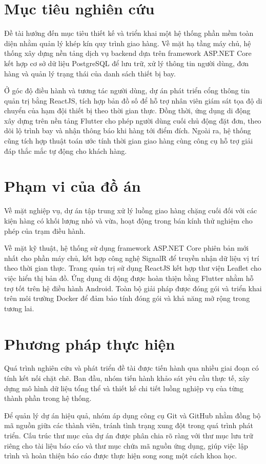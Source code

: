 \section{Mục tiêu nghiên cứu}
Đề tài hướng đến mục tiêu thiết kế và triển khai một hệ thống phần mềm toàn diện nhằm quản lý khép kín quy trình giao hàng. Về mặt hạ tầng máy chủ, hệ thống xây dựng nền tảng dịch vụ backend dựa trên framework ASP.NET Core kết hợp cơ sở dữ liệu PostgreSQL để lưu trữ, xử lý thông tin người dùng, đơn hàng và quản lý trạng thái của danh sách thiết bị bay.

Ở góc độ điều hành và tương tác người dùng, dự án phát triển cổng thông tin quản trị bằng ReactJS, tích hợp bản đồ số để hỗ trợ nhân viên giám sát tọa độ di chuyển của hạm đội thiết bị theo thời gian thực. Đồng thời, ứng dụng di động xây dựng trên nền tảng Flutter cho phép người dùng cuối chủ động đặt đơn, theo dõi lộ trình bay và nhận thông báo khi hàng tới điểm đích. Ngoài ra, hệ thống cũng tích hợp thuật toán ước tính thời gian giao hàng cùng công cụ hỗ trợ giải đáp thắc mắc tự động cho khách hàng.

\section{Phạm vi của đồ án}
Về mặt nghiệp vụ, dự án tập trung xử lý luồng giao hàng chặng cuối đối với các kiện hàng có khối lượng nhỏ và vừa, hoạt động trong bán kính thử nghiệm cho phép của trạm điều hành. 

Về mặt kỹ thuật, hệ thống sử dụng framework ASP.NET Core phiên bản mới nhất cho phần máy chủ, kết hợp công nghệ SignalR để truyền nhận dữ liệu vị trí theo thời gian thực. Trang quản trị sử dụng ReactJS kết hợp thư viện Leaflet cho việc hiển thị bản đồ. Ứng dụng di động được hoàn thiện bằng Flutter nhằm hỗ trợ tốt trên hệ điều hành Android. Toàn bộ giải pháp được đóng gói và triển khai trên môi trường Docker để đảm bảo tính đóng gói và khả năng mở rộng trong tương lai.

\section{Phương pháp thực hiện}
Quá trình nghiên cứu và phát triển đề tài được tiến hành qua nhiều giai đoạn có tính kết nối chặt chẽ. Ban đầu, nhóm tiến hành khảo sát yêu cầu thực tế, xây dựng mô hình dữ liệu tổng thể và thiết kế chi tiết luồng nghiệp vụ của từng thành phần trong hệ thống.

Để quản lý dự án hiệu quả, nhóm áp dụng công cụ Git và GitHub nhằm đồng bộ mã nguồn giữa các thành viên, tránh tình trạng xung đột trong quá trình phát triển. Cấu trúc thư mục của dự án được phân chia rõ ràng với thư mục lưu trữ riêng cho tài liệu báo cáo và thư mục chứa mã nguồn ứng dụng, giúp việc lập trình và hoàn thiện báo cáo được thực hiện song song một cách khoa học.